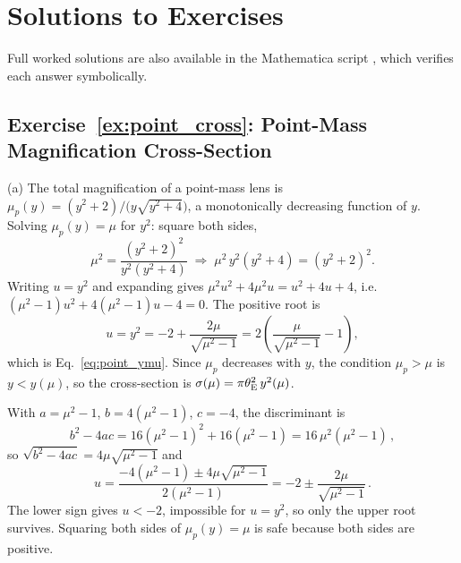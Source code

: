 
\section{Solutions to Exercises}
\label{sec:statistics_solutions}

\noindent
Full worked solutions are also available in the Mathematica script
,
which verifies each answer symbolically.

\subsection*{Exercise~\ref{ex:point_cross}: Point-Mass Magnification Cross-Section}

(a) The total magnification of a point-mass lens is
$\mu_p(y) = (y^2+2)/\big(y\sqrt{y^2+4}\big)$, a monotonically decreasing
function of $y$.  Solving $\mu_p(y) = \mu$ for $y^2$: square both sides,
\[
    \mu^2 = \frac{(y^2+2)^2}{y^2(y^2+4)}
    \;\Longrightarrow\;
    \mu^2\,y^2(y^2+4) = (y^2+2)^2 .
\]
Writing $u = y^2$ and expanding gives
$\mu^2 u^2 + 4\mu^2 u = u^2 + 4u + 4$, i.e.
$(\mu^2-1)u^2 + 4(\mu^2-1)u - 4 = 0$.  The positive root is
\[
    u = y^2 = -2 + \frac{2\mu}{\sqrt{\mu^2-1}}
    = 2\left(\frac{\mu}{\sqrt{\mu^2-1}} - 1\right),
\]
which is Eq.~\eqref{eq:point_ymu}.  Since $\mu_p$ decreases with $y$, the
condition $\mu_p > \mu$ is $y < y(\mu)$, so the cross-section is
$\sigma(\mu) = \pi\theta_{\mathrm{E}}^2\,y^2(\mu)$. \checkmark

\begin{derivation}
With $a = \mu^2-1$, $b = 4(\mu^2-1)$, $c = -4$, the discriminant is
\begin{equation*}
    b^2 - 4ac = 16(\mu^2-1)^2 + 16(\mu^2-1) = 16\,\mu^2(\mu^2-1)\,,
\end{equation*}
so $\sqrt{b^2-4ac} = 4\mu\sqrt{\mu^2-1}$ and
\begin{equation*}
    u = \frac{-4(\mu^2-1) \pm 4\mu\sqrt{\mu^2-1}}{2(\mu^2-1)}
    = -2 \pm \frac{2\mu}{\sqrt{\mu^2-1}}\,.
\end{equation*}
The lower sign gives $u < -2$, impossible for $u = y^2$, so only the upper
root survives.  Squaring both sides of $\mu_p(y) = \mu$ is safe because
both sides are positive.
\end{derivation}

